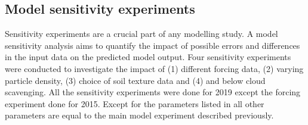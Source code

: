 \subsection{Model sensitivity experiments}
Sensitivity experiments are a crucial part of any modelling study. A model sensitivity analysis aims to quantify the impact of possible errors and differences in the input data on the predicted model output. Four sensitivity experiments were conducted to investigate the impact of (1) different forcing data, (2) varying particle density, (3) choice of soil texture data and (4) and below cloud scavenging. All the sensitivity experiments were done for 2019 except the forcing experiment done for 2015. Except for the parameters listed in  all other parameters are equal to the main model experiment described previously. 

\begin{table}[htpb]\label{tab:sensitivity_exp}
\caption{The model sensitivity experiments that have been performed}
\centering

\end{table}



